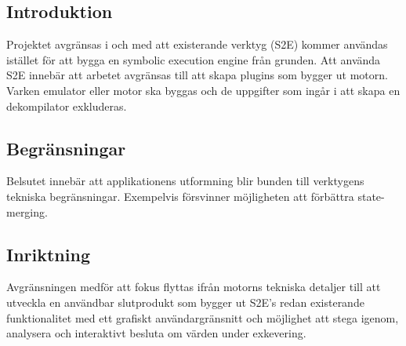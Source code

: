 
\subsection{Introduktion} 

Projektet avgränsas i och med att existerande verktyg (S2E) kommer användas 
istället för att bygga en symbolic execution engine från grunden. 
Att använda S2E innebär att arbetet avgränsas till att skapa plugins som 
bygger ut motorn. Varken emulator eller motor ska byggas och de uppgifter 
som ingår i att skapa en dekompilator exkluderas. 

\subsection{Begränsningar} 

Belsutet innebär att applikationens utformning blir bunden till 
verktygens tekniska begränsningar. Exempelvis försvinner möjligheten att 
förbättra state-merging. 

\subsection{Inriktning} 

Avgränsningen medför att fokus flyttas ifrån motorns tekniska detaljer 
till att utveckla en användbar slutprodukt som bygger ut S2E's redan 
existerande funktionalitet med ett grafiskt användargränsnitt 
och möjlighet att stega igenom, analysera och interaktivt besluta om 
värden under exkevering.
 
